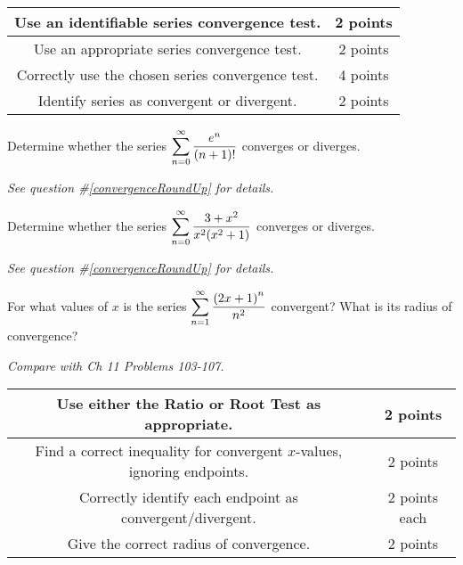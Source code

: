 \documentclass[12pt]{exam}
\newcommand{\ds}{\ensuremath{\displaystyle}}
\begin{document}
\begin{questions}
\begin{center}
  \begin{tabular}{|c|c|}
    \hline
    Use an identifiable series convergence test. & 2 points \\
    \hline
    Use an appropriate series convergence test. & 2 points \\
    \hline
    Correctly use the chosen series convergence test. & 4 points \\
    \hline
    Identify series as convergent or divergent. & 2 points \\
    \hline
  \end{tabular}
\end{center}

\vfill

\newpage

\question[10]
Determine whether the series
$\ds \sum_{n = 0}^{\infty} \frac{e^n}{(n+1)!}$
converges or diverges.

\textit{See question \#\ref{convergenceRoundUp} for details.}

\vfill

\newpage

\question[10]
Determine whether the series
$\ds \sum_{n = 0}^{\infty} \frac{3+x^2}{x^2(x^2+1)}$
converges or diverges.

\textit{See question \#\ref{convergenceRoundUp} for details.}

\vfill

\newpage

\question[10]
For what values of $x$ is the series
$\ds \sum_{n=1}^{\infty} \frac{\left(2x+1\right)^n}{n^2}$ convergent?
What is its radius of convergence?

\textit{Compare with Ch 11 Problems 103-107.}

\begin{center}
  \begin{tabular}{|c|c|}
    \hline
    Use either the Ratio or Root Test as appropriate. & 2 points \\
    \hline
    Find a correct inequality for convergent $x$-values,
    ignoring endpoints. & 2 points \\
    \hline
    Correctly identify each endpoint as convergent/divergent. & 2 points each \\
    \hline
    Give the correct radius of convergence. & 2 points \\
    \hline
  \end{tabular}
\end{center}


\end{questions}
\end{document}
